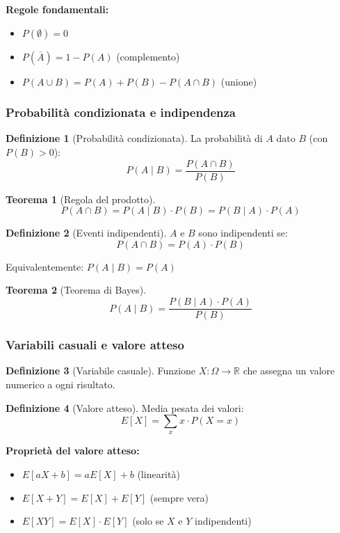 \documentclass[a4paper, 11pt]{article}
\newtheorem{teorema}{Teorema}[section]
\theoremstyle{definition}
\newtheorem{definizione}{Definizione}[section]
\theoremstyle{remark}
\theoremstyle{remark}
\begin{document}
	\textbf{Regole fondamentali:}
	\begin{itemize}
		\item $P(\emptyset) = 0$
		\item $P(\overline{A}) = 1 - P(A)$ (complemento)
		\item $P(A \cup B) = P(A) + P(B) - P(A \cap B)$ (unione)
	\end{itemize}
	
	\subsubsection{Probabilità condizionata e indipendenza}
	
	\begin{definizione}[Probabilità condizionata]
		La probabilità di $A$ dato $B$ (con $P(B) > 0$):
		\[
		P(A \mid B) = \frac{P(A \cap B)}{P(B)}
		\]
	\end{definizione}
	
	\begin{teorema}[Regola del prodotto]
		\[
		P(A \cap B) = P(A \mid B) \cdot P(B) = P(B \mid A) \cdot P(A)
		\]
	\end{teorema}
	
	\begin{definizione}[Eventi indipendenti]
		$A$ e $B$ sono indipendenti se:
		\[
		P(A \cap B) = P(A) \cdot P(B)
		\]
		
		Equivalentemente: $P(A \mid B) = P(A)$
	\end{definizione}
	
	\begin{teorema}[Teorema di Bayes]
		\[
		P(A \mid B) = \frac{P(B \mid A) \cdot P(A)}{P(B)}
		\]
	\end{teorema}
	
	\subsubsection{Variabili casuali e valore atteso}
	
	\begin{definizione}[Variabile casuale]
		Funzione $X: \Omega \to \mathbb{R}$ che assegna un valore numerico a ogni risultato.
	\end{definizione}
	
	\begin{definizione}[Valore atteso]
		Media pesata dei valori:
		\[
		E[X] = \sum_{x} x \cdot P(X = x)
		\]
	\end{definizione}
	
	\textbf{Proprietà del valore atteso:}
	\begin{itemize}
		\item $E[aX + b] = aE[X] + b$ (linearità)
		\item $E[X + Y] = E[X] + E[Y]$ (sempre vera)
		\item $E[XY] = E[X] \cdot E[Y]$ (solo se $X$ e $Y$ indipendenti)
	\end{itemize}
	
\end{document}
